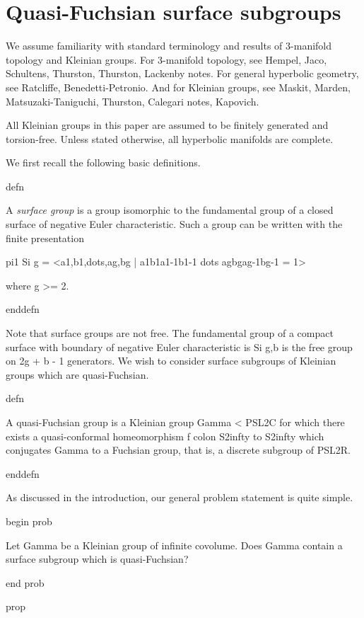 \section{Quasi-Fuchsian surface subgroups}

We assume familiarity with standard terminology and results of 3-manifold
topology and Kleinian groups.  For 3-manifold topology, see Hempel, Jaco,
Schultens, Thurston, Thurston, Lackenby notes. For general hyperbolic geometry,
see Ratcliffe, Benedetti-Petronio. And for Kleinian groups, see Maskit, Marden,
Matsuzaki-Taniguchi, Thurston, Calegari notes, Kapovich.

All Kleinian groups in this paper are assumed to be finitely generated and
torsion-free. Unless stated otherwise, all hyperbolic manifolds are complete.

We first recall the following basic definitions.

defn

A \emph{surface group} is a group isomorphic to the fundamental group of
a closed surface of negative Euler characteristic. Such a group can be written
with the finite presentation

pi1 Si g = <a1,b1,dots,ag,bg | a1b1a1-1b1-1 dots agbgag-1bg-1 = 1>

where g >= 2.

enddefn

Note that surface groups are not free. The fundamental group of a compact
surface with boundary of negative Euler characteristic is Si g,b is the free
group on 2g + b - 1 generators. We wish to consider surface subgroups of
Kleinian groups which are quasi-Fuchsian.

defn

A {quasi-Fuchsian group} is a Kleinian group Gamma < PSL2C for which there
exists a quasi-conformal homeomorphism f colon S2infty to S2infty which
conjugates Gamma to a Fuchsian group, that is, a discrete subgroup of PSL2R.

enddefn

As discussed in the introduction, our general problem statement is quite
simple.

begin prob

Let Gamma be a Kleinian group of infinite covolume. Does Gamma contain
a surface subgroup which is quasi-Fuchsian?

end prob


prop

